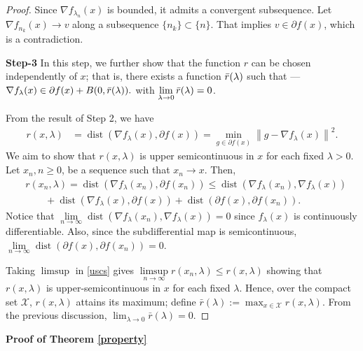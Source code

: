 \documentclass[9pt,journal,twoside,web]{ieeecolor}
\newcommand{\norm}[1]{\left\lVert #1 \right\rVert}
\DeclareMathOperator*{\dist}{dist}
\begin{document}
\begin{proof}
Since $\nabla f_{\lambda_n} (x)$ is bounded, it admits a convergent subsequence. Let $\nabla f_{n_k} (x) \to v$ along a subsequence $\{n_k\}\subset \{n\}$. That implies $v \in \partial f(x)$, which is a contradiction. 

\textbf{Step-3} In this step, we further show that the function 
$r$ can be chosen independently of 
$x$; that is, there exists a function 
$\Bar{r}(\lambda)$ such that --- $ \nabla f_\lambda  (x)  \in \partial f(x) + B(0,\Bar{r}(\lambda)).$
with  $\lim\limits_{\lambda \to 0} \Bar{r}(\lambda) = 0$.


From the result of Step 2, we have 
\begin{equation*}
\begin{split}
    r(x, \lambda) & = \dist (\nabla f_\lambda(x), \partial f(x))
    = \min\limits_{g \in \partial f(x)} \norm{g - \nabla f_\lambda(x)}^2.
    \end{split}
\end{equation*}
We aim to show that  $r(x,\lambda)$ is upper semicontinuous in $x$ for each fixed $\lambda > 0$. 
Let $x_n,n\geq 0$, be a sequence such that $x_n \to x$. Then,
\begin{equation}
    \begin{split}
        & r(x_n,\lambda)  =   \dist (\nabla f_\lambda(x_n), \partial f(x_n))
     \leq   \dist (\nabla f_\lambda(x_n), \nabla f_\lambda(x)) \\ & \qquad + \dist(\nabla f_\lambda (x), \partial f(x)) + \dist (\partial f(x),\partial f(x_n)). 
    \end{split}
    \label{uscs}
\end{equation}
Notice that  $ \lim\limits_{n \to \infty} \dist (\nabla f_\lambda(x_n), \nabla f_\lambda(x)) = 0$ since $f_\lambda(x)$ is continuously differentiable. Also, since the subdifferential map is semicontinuous, $ \lim\limits_{n \to \infty} \dist (\partial f(x),\partial f(x_n))  = 0.$

Taking $\limsup$ in \eqref{uscs} gives $\limsup\limits_{n \to \infty} r(x_n,\lambda) \leq r(x,\lambda) $
showing that 
$r(x,\lambda)$ is upper-semicontinuous in $x$ for each fixed 
$\lambda$. Hence, over the compact set $\mathcal{X}$, $r(x,\lambda)$ attains its maximum; define $\bar{r}(\lambda) := \max_{x \in \mathcal{X}} r(x,\lambda)$. From the previous discussion, $\lim_{\lambda \to 0} \bar{r}(\lambda) = 0$.
\end{proof}

\textbf{Proof of Theorem \ref{property}}
\end{document}

